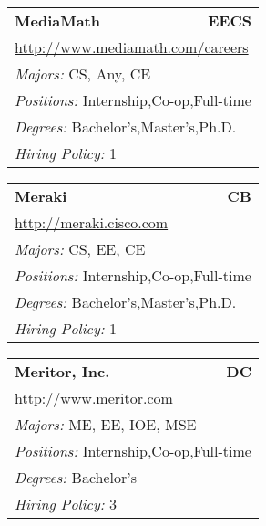 \documentclass[twoside]{article}
\begin{document}
\begin{center}
\begin{multicols}{3}
\begin{FlushLeft}
\begin{minipage}{\columnwidth}
\end{minipage}
 
\begin{minipage}{\columnwidth}\begin{tabularx}{.95\columnwidth}{Xr}
                 {\Large\bf MediaMath} & {\Large\bf EECS}\\
    \multicolumn{2}{p{.95\columnwidth}}{\url{http://www.mediamath.com/careers}}\\
    \multicolumn{2}{p{.95\columnwidth}}{\emph{Majors:} CS, Any, CE}\\
    \multicolumn{2}{p{.95\columnwidth}}{\emph{Positions:} Internship,Co-op,Full-time}\\
    \multicolumn{2}{p{.95\columnwidth}}{\emph{Degrees:} Bachelor's,Master's,Ph.D.}\\
    \multicolumn{2}{p{.95\columnwidth}}{\emph{Hiring Policy:} 1}\\
    \end{tabularx}
    
\end{minipage}
 
\begin{minipage}{\columnwidth}\begin{tabularx}{.95\columnwidth}{Xr}
                 {\Large\bf Meraki} & {\Large\bf CB}\\
    \multicolumn{2}{p{.95\columnwidth}}{\url{http://meraki.cisco.com}}\\
    \multicolumn{2}{p{.95\columnwidth}}{\emph{Majors:} CS, EE, CE}\\
    \multicolumn{2}{p{.95\columnwidth}}{\emph{Positions:} Internship,Co-op,Full-time}\\
    \multicolumn{2}{p{.95\columnwidth}}{\emph{Degrees:} Bachelor's,Master's,Ph.D.}\\
    \multicolumn{2}{p{.95\columnwidth}}{\emph{Hiring Policy:} 1}\\
    \end{tabularx}
    
\end{minipage}
 
\begin{minipage}{\columnwidth}\begin{tabularx}{.95\columnwidth}{Xr}
                 {\Large\bf Meritor, Inc.} & {\Large\bf DC}\\
    \multicolumn{2}{p{.95\columnwidth}}{\url{http://www.meritor.com}}\\
    \multicolumn{2}{p{.95\columnwidth}}{\emph{Majors:} ME, EE, IOE, MSE}\\
    \multicolumn{2}{p{.95\columnwidth}}{\emph{Positions:} Internship,Co-op,Full-time}\\
    \multicolumn{2}{p{.95\columnwidth}}{\emph{Degrees:} Bachelor's}\\
    \multicolumn{2}{p{.95\columnwidth}}{\emph{Hiring Policy:} 3}\\
    \end{tabularx}
    

\end{minipage}
\end{FlushLeft}
\end{multicols}
\end{center}
\end{document}
